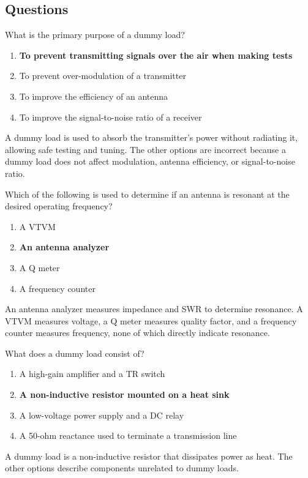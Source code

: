 \subsection*{Questions}
\begin{tcolorbox}[colback=gray!10!white,colframe=black!75!black,title={T7C01}]
    What is the primary purpose of a dummy load?
    \begin{enumerate}[label=\Alph*,noitemsep]
        \item \textbf{To prevent transmitting signals over the air when making tests}
        \item To prevent over-modulation of a transmitter
        \item To improve the efficiency of an antenna
        \item To improve the signal-to-noise ratio of a receiver
    \end{enumerate}
\end{tcolorbox}
A dummy load is used to absorb the transmitter's power without radiating it, allowing safe testing and tuning. The other options are incorrect because a dummy load does not affect modulation, antenna efficiency, or signal-to-noise ratio.


\begin{tcolorbox}[colback=gray!10!white,colframe=black!75!black,title={T7C02}]
    Which of the following is used to determine if an antenna is resonant at the desired operating frequency?
    \begin{enumerate}[label=\Alph*,noitemsep]
        \item A VTVM
        \item \textbf{An antenna analyzer}
        \item A Q meter
        \item A frequency counter
    \end{enumerate}
\end{tcolorbox}
An antenna analyzer measures impedance and SWR to determine resonance. A VTVM measures voltage, a Q meter measures quality factor, and a frequency counter measures frequency, none of which directly indicate resonance.


\begin{tcolorbox}[colback=gray!10!white,colframe=black!75!black,title={T7C03}]
    What does a dummy load consist of?
    \begin{enumerate}[label=\Alph*,noitemsep]
        \item A high-gain amplifier and a TR switch
        \item \textbf{A non-inductive resistor mounted on a heat sink}
        \item A low-voltage power supply and a DC relay
        \item A 50-ohm reactance used to terminate a transmission line
    \end{enumerate}
\end{tcolorbox}
A dummy load is a non-inductive resistor that dissipates power as heat. The other options describe components unrelated to dummy loads.


